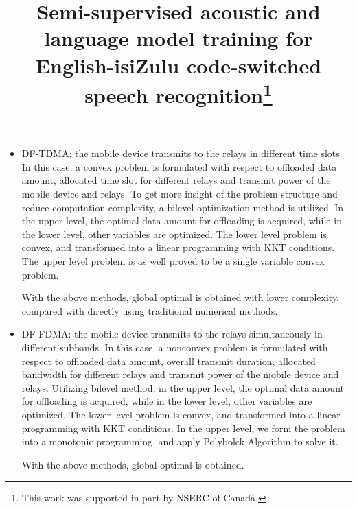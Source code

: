 \documentclass{IEEEtran}
\begin{document}
       \begin{itemize}
	\item DF-TDMA: the mobile device transmits to the relays in different time slots.
	In this case, a convex problem is formulated with respect to offloaded data amount, allocated time slot for different relays and transmit power of the mobile device and relays.
	To get more insight of the problem structure and reduce computation complexity, a bilevel optimization method is utilized. In the upper level, the optimal data amount for offloading is acquired, while in the lower level, other variables are optimized. The lower level problem is convex, and transformed into a linear programming with KKT conditions. The upper level problem is as well proved to be a single variable convex problem.

	With the above methods, global optimal is obtained with lower complexity, compared with directly using traditional numerical methods.

	\item DF-FDMA: the mobile device transmits to the relays simultaneously in different subbands.
	In this case, a nonconvex problem is formulated with respect to offloaded data amount, overall transmit duration, allocated bandwidth for different relays and transmit power of the mobile device and relays.
	Utilizing bilevel method, in the upper level, the optimal data amount for offloading is acquired, while in the lower level, other variables are optimized.
	The lower level problem is convex, and transformed into a linear programming with KKT conditions. In the upper level, we form the problem into a monotonic programming, and apply Polybolck Algorithm to solve it.

	With the above methods, global optimal is obtained.
\end{itemize}

\author{
}


\title{\textbf{Semi-supervised acoustic and language model training for English-isiZulu code-switched speech recognition}\thanks{This work was supported in part by NSERC of Canada.}}
\end{document}

